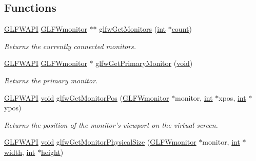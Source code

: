\subsection*{Functions}
\begin{DoxyCompactItemize}
\item 
\hyperlink{glfw3_8h_a56da5036b2cc259351ae22fd6439bb47}{G\-L\-F\-W\-A\-P\-I} \hyperlink{group__monitor_ga8d9efd1cde9426692c73fe40437d0ae3}{G\-L\-F\-Wmonitor} $\ast$$\ast$ \hyperlink{group__monitor_gab4d483284c57e28837bc2cd9639e9665}{glfw\-Get\-Monitors} (\hyperlink{wglew_8h_a500a82aecba06f4550f6849b8099ca21}{int} $\ast$\hyperlink{glew_8h_a10b284d589000663becfbc6867a3a9f7}{count})
\begin{DoxyCompactList}\small\item\em Returns the currently connected monitors. \end{DoxyCompactList}\item 
\hyperlink{glfw3_8h_a56da5036b2cc259351ae22fd6439bb47}{G\-L\-F\-W\-A\-P\-I} \hyperlink{group__monitor_ga8d9efd1cde9426692c73fe40437d0ae3}{G\-L\-F\-Wmonitor} $\ast$ \hyperlink{group__monitor_ga59ea49f377fe701dd76764183e64d9f4}{glfw\-Get\-Primary\-Monitor} (\hyperlink{wglew_8h_aeea6e3dfae3acf232096f57d2d57f084}{void})
\begin{DoxyCompactList}\small\item\em Returns the primary monitor. \end{DoxyCompactList}\item 
\hyperlink{glfw3_8h_a56da5036b2cc259351ae22fd6439bb47}{G\-L\-F\-W\-A\-P\-I} \hyperlink{wglew_8h_aeea6e3dfae3acf232096f57d2d57f084}{void} \hyperlink{group__monitor_ga45b5481a614ad7beb2aade9746d07563}{glfw\-Get\-Monitor\-Pos} (\hyperlink{group__monitor_ga8d9efd1cde9426692c73fe40437d0ae3}{G\-L\-F\-Wmonitor} $\ast$monitor, \hyperlink{wglew_8h_a500a82aecba06f4550f6849b8099ca21}{int} $\ast$xpos, \hyperlink{wglew_8h_a500a82aecba06f4550f6849b8099ca21}{int} $\ast$ypos)
\begin{DoxyCompactList}\small\item\em Returns the position of the monitor's viewport on the virtual screen. \end{DoxyCompactList}\item 
\hyperlink{glfw3_8h_a56da5036b2cc259351ae22fd6439bb47}{G\-L\-F\-W\-A\-P\-I} \hyperlink{wglew_8h_aeea6e3dfae3acf232096f57d2d57f084}{void} \hyperlink{group__monitor_gadb3e088860fecedda3dabfd909b4df2b}{glfw\-Get\-Monitor\-Physical\-Size} (\hyperlink{group__monitor_ga8d9efd1cde9426692c73fe40437d0ae3}{G\-L\-F\-Wmonitor} $\ast$monitor, \hyperlink{wglew_8h_a500a82aecba06f4550f6849b8099ca21}{int} $\ast$\hyperlink{glew_8h_aa105b18f96e6bc2485cb7f576a7fb9ba}{width}, \hyperlink{wglew_8h_a500a82aecba06f4550f6849b8099ca21}{int} $\ast$\hyperlink{glew_8h_aa214bd63e12f7ddf524c83894fcc69a7}{height})
$$
\end{DoxyCompactItemize}
